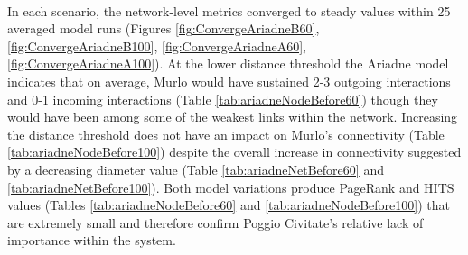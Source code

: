 \documentclass[12pt,a4paper]{thesis}
\begin{document}
\paragraph{}
In each scenario, the network-level metrics converged to steady values within 25 averaged model runs (Figures \ref{fig:ConvergeAriadneB60}, \ref{fig:ConvergeAriadneB100}, \ref{fig:ConvergeAriadneA60}, \ref{fig:ConvergeAriadneA100}). At the lower distance threshold the Ariadne model indicates that on average, Murlo would have sustained 2-3 outgoing interactions and 0-1 incoming interactions (Table \ref{tab:ariadneNodeBefore60}) though they would have been among some of the weakest links within the network. Increasing the distance threshold does not have an impact on Murlo's connectivity (Table \ref{tab:ariadneNodeBefore100}) despite the overall increase in connectivity suggested by a decreasing diameter value (Table \ref{tab:ariadneNetBefore60} and \ref{tab:ariadneNetBefore100}). Both model variations produce PageRank and HITS values (Tables \ref{tab:ariadneNodeBefore60} and \ref{tab:ariadneNodeBefore100}) that are extremely small and therefore confirm Poggio Civitate's relative lack of importance within the system.   
\end{document}
